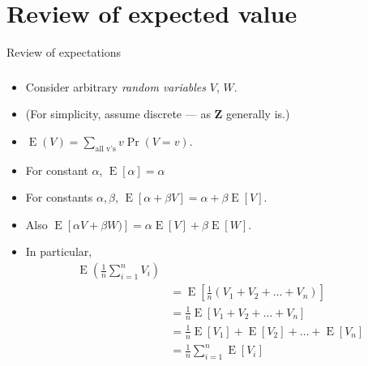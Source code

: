 \documentclass[table, xcolor={dvipsnames}, 9pt]{beamer}
\theoremstyle{newstyle}
\DeclareMathOperator{\E}{\mathrm{E}}
\begin{document}
\section{Review of expected value}
\begin{frame}{Review of expectations}
\frametitle{}
  \begin{itemize}
  \item Consider arbitrary \textit{random variables} $V$, $W$.
  \item (For simplicity, assume discrete --- as $\mathbf{Z}$ generally is.)
  \item  $\E(V) = \sum_{\mbox{all v's}} v\Pr(V=v) $.
  \item For constant $\alpha$, $\E \left[\alpha\right] = \alpha$
  \item For constants $\alpha, \beta$, $\E \left[\alpha + \beta V\right] = \alpha + \beta\E\left[V\right]$.
  \item Also $\E\left[\alpha V + \beta W)\right] = \alpha \E\left[V\right] + \beta \E\left[W\right]$. 
  \item In particular, 
  \begin{align*}
\E\left(\frac{1}{n} \sum_{i=1}^n V_i\right) & \\
& = \E \left[\frac{1}{n} \left(V_1 + V_2 + \dots + V_n\right)\right] \\
& = \frac{1}{n}\E \left[V_1 + V_2 + \dots + V_n\right] \\ 
& = \frac{1}{n}\E \left[V_1\right] + \E\left[V_2\right] + \dots + \E\left[V_n\right] \\ 
& = \frac{1}{n} \sum_{i=1}^n \E \left[V_i\right] 
\end{align*}
  \end{itemize}
\end{frame}
\end{document}
